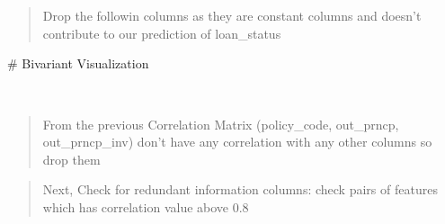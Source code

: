 \documentclass[11pt]{article}
\begin{document}
    \begin{center}
    \end{center}
    { \hspace*{\fill} \\}
    
    \begin{center}
    \end{center}
    { \hspace*{\fill} \\}
    
    \begin{quote}
Drop the followin columns as they are constant columns and doesn't
contribute to our prediction of loan\_status
\end{quote}

    \# Bivariant Visualization

    \begin{center}
    \end{center}
    { \hspace*{\fill} \\}
    
    \begin{quote}
From the previous Correlation Matrix (policy\_code, out\_prncp,
out\_prncp\_inv) don't have any correlation with any other columns so
drop them
\end{quote}

    \begin{quote}
Next, Check for redundant information columns: check pairs of features
which has correlation value above 0.8
\end{quote}
\end{document}
